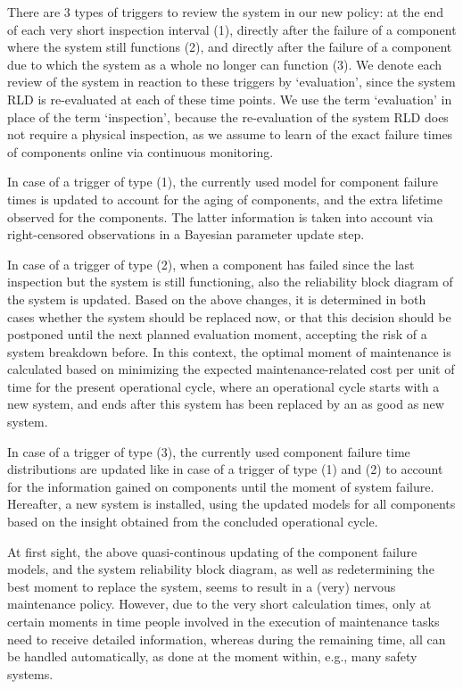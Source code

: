 \documentclass[authoryear]{elsarticle}
\begin{document}
There are 3 types of triggers to review the system in our new policy:
at the end of each very short inspection interval (1),
directly after the failure of a component where the system still functions (2),
and directly after the failure of a component due to which the system as a whole no longer can function (3). 
We denote each review of the system in reaction to these triggers by `evaluation',
since the system RLD is re-evaluated at each of these time points.
We use the term `evaluation' in place of the term `inspection',
because the re-evaluation of the system RLD does not require a physical inspection,
as we assume to learn of the exact failure times of components online via continuous monitoring.

In case of a trigger of type (1),
the currently used model for component failure times is updated
to account for the aging of components,
and the extra lifetime observed for the components.
The latter information is taken into account via right-censored observations
in a Bayesian parameter update step.

In case of a trigger of type (2),
when a component has failed since the last inspection but the system is still functioning,
also the reliability block diagram of the system is updated.
Based on the above changes,
it is determined in both cases whether the system should be replaced now,
or that this decision should be postponed until the next planned evaluation moment,
accepting the risk of a system breakdown before.
In this context, the optimal moment of maintenance
is calculated based on minimizing the expected maintenance-related cost per unit of time for the present operational cycle,
where an operational cycle starts with a new system, and ends after this system has been replaced by an as good as new system. 

In case of a trigger of type (3),
the currently used component failure time distributions are updated
like in case of a trigger of type (1) and (2)
to account for the information gained on components
until the moment of system failure.
Hereafter, a new system is installed,
using the updated models for all components based on the insight obtained from the concluded operational cycle.

At first sight, the above quasi-continous updating of the component failure models,
and the system reliability block diagram,
as well as redetermining the best moment to replace the system,
seems to result in a (very) nervous maintenance policy.
However, due to the very short calculation times,
only at certain moments in time people involved in the execution of maintenance tasks
need to receive detailed information,
whereas during the remaining time,
all can be handled automatically, as done at the moment within, e.g., many safety systems. 
\end{document}
